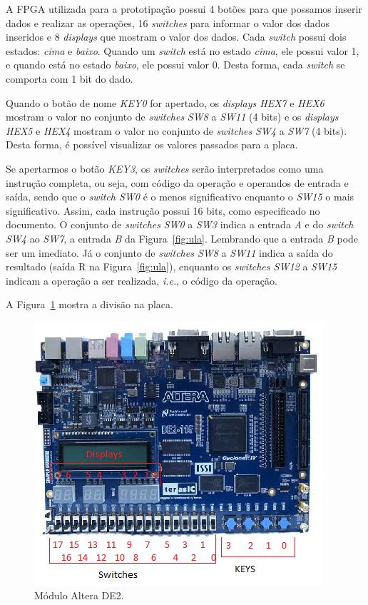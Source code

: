 \documentclass[11pt,a4paper,titlepage]{article}
\begin{document}
A FPGA utilizada para a prototipação possui 4 botões para que possamos inserir dados e realizar as operações, 16 \textit{switches} para informar o valor dos dados inseridos e 8 \textit{displays} que mostram o valor dos dados.
Cada \textit{switch} possui dois estados: \textit{cima} e \textit{baixo}.
Quando um \textit{switch} está no estado \textit{cima}, ele possui valor 1, e quando está no estado \textit{baixo}, ele possui valor 0.
Desta forma, cada \textit{switch} se comporta com 1 bit do dado.

Quando o botão de nome \textit{KEY0} for apertado, os \textit{displays HEX7} e \textit{HEX6} mostram o valor no conjunto de \textit{switches} \textit{SW8} a \textit{SW11} (4 bits) e os \textit{displays HEX5} e \textit{HEX4} mostram o valor no conjunto de \textit{switches} \textit{SW4} a \textit{SW7} (4 bits).
Desta forma, é possível visualizar os valores passados para a placa.

Se apertarmos o botão \textit{KEY3}, os \textit{switches} serão interpretados como uma instrução completa, ou seja, com código da operação e operandos de entrada e saída, sendo que o \textit{switch SW0} é o menos significativo enquanto o \textit{SW15} o mais significativo.
Assim, cada instrução possui 16 bits, como especificado no documento.
O conjunto de \textit{switches} \textit{SW0} a \textit{SW3} indica a entrada \textit{A} e do \textit{switch SW4} ao \textit{SW7}, a entrada \textit{B} da Figura~\ref{fig:ula}.
Lembrando que a entrada \textit{B} pode ser um imediato.
Já o conjunto de \textit{switches SW8} a \textit{SW11} indica a saída do resultado (saída R na Figura~\ref{fig:ula}), enquanto os \textit{switches SW12} a \textit{SW15} indicam a operação a ser realizada, \textit{i.e.}, o código da operação.

A Figura~\ref{fig:fpga} mostra a divisão na placa.

\begin{figure}[h]
\centering
\includegraphics[]{images/FPGA.png}
\caption{Módulo Altera DE2.}
\label{fig:fpga}
\end{figure}
\end{document}

